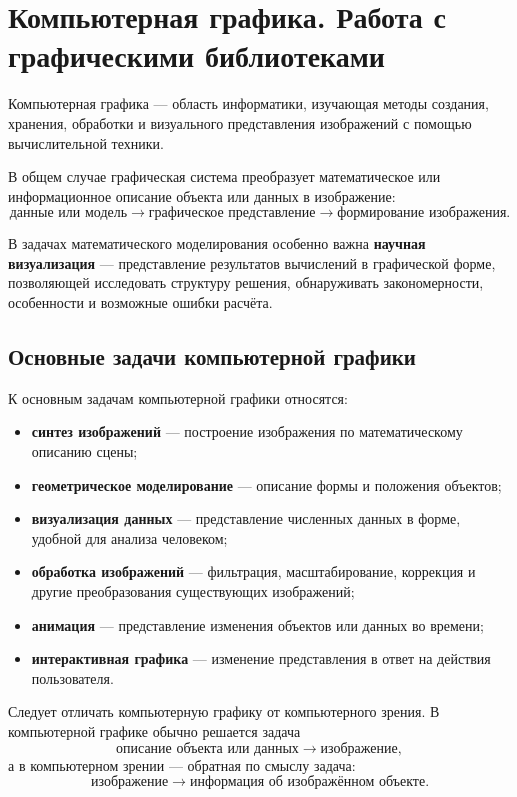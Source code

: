 \section{Компьютерная графика. Работа с графическими библиотеками}

Компьютерная графика --- область информатики, изучающая методы создания, хранения, обработки и визуального представления изображений с помощью вычислительной техники.

В общем случае графическая система преобразует математическое или информационное описание объекта или данных в изображение:
\[
\text{данные или модель}
\longrightarrow
\text{графическое представление}
\longrightarrow
\text{формирование изображения}.
\]

В задачах математического моделирования особенно важна \textbf{научная визуализация} --- представление результатов вычислений в графической форме, позволяющей исследовать структуру решения, обнаруживать закономерности, особенности и возможные ошибки расчёта.

\subsection{Основные задачи компьютерной графики}

К основным задачам компьютерной графики относятся:
\begin{itemize}
	\item \textbf{синтез изображений} --- построение изображения по математическому описанию сцены;
	\item \textbf{геометрическое моделирование} --- описание формы и положения объектов;
	\item \textbf{визуализация данных} --- представление численных данных в форме, удобной для анализа человеком;
	\item \textbf{обработка изображений} --- фильтрация, масштабирование, коррекция и другие преобразования существующих изображений;
	\item \textbf{анимация} --- представление изменения объектов или данных во времени;
	\item \textbf{интерактивная графика} --- изменение представления в ответ на действия пользователя.
\end{itemize}

Следует отличать компьютерную графику от компьютерного зрения. В компьютерной графике обычно решается задача
\[
\text{описание объекта или данных}
\rightarrow
\text{изображение},
\]
а в компьютерном зрении --- обратная по смыслу задача:
\[
\text{изображение}
\rightarrow
\text{информация об изображённом объекте}.
\]

